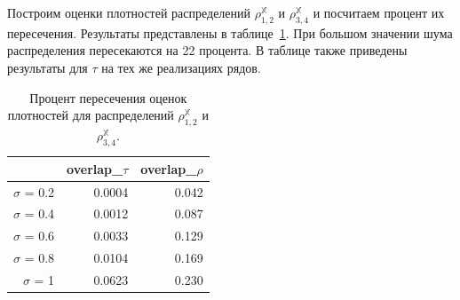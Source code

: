 \documentclass[specialist,
               substylefile = spbu.rtx,
               subf,href,colorlinks=true, 12pt]{disser}
\begin{document}
Построим оценки плотностей распределений $\rho^{\mathbb{X}}_{1,2}$  и  $\rho^{\mathbb{X}}_{3,4}$  и посчитаем процент их пересечения. Результаты представлены в таблице~\ref{tab:model_dist_pgram_overlap22}. При большом значении шума распределения пересекаются на 22 процента.
В таблице также приведены результаты для $\tau$ на тех же реализациях рядов.

\begin{table}[hhh!]
\caption{Процент пересечения оценок плотностей для распределений $\rho^{\mathbb{X}}_{1,2}$  и $\rho^{\mathbb{X}}_{3,4}$.}
\centering
\begin{tabular}{rrr}
  \hline
& overlap\_$\tau$& overlap\_$\rho$ \\
  \hline
$\sigma$ = 0.2 & 0.0004 & 0.042 \\ 
  $\sigma$ = 0.4 & 0.0012 & 0.087 \\ 
  $\sigma$ = 0.6 & 0.0033 & 0.129 \\ 
  $\sigma$ = 0.8 & 0.0104 & 0.169 \\ 
  $\sigma$ = 1 & 0.0623 & 0.230 \\ 
   \hline
\end{tabular}
\label{tab:model_dist_pgram_overlap22}
\end{table}
%
%
%
%
%
\end{document}
